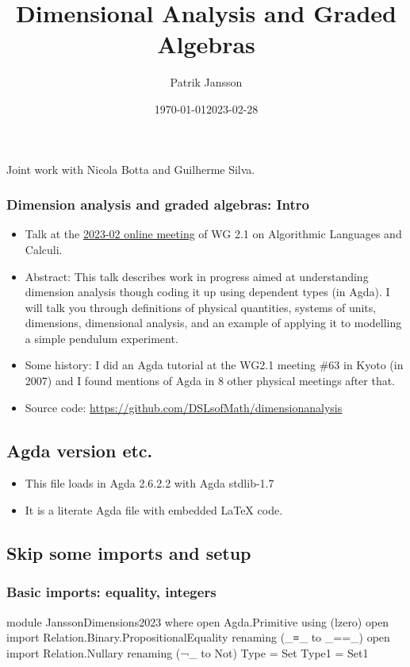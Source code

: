\documentclass[aspectratio=169]{beamer}
\author[Jansson]{Patrik Jansson}
\date{\today}
\institute[FP unit, Chalmers]{Functional Programming unit, Chalmers University of Technology}
\date{2023-02-28}
\title{Dimensional Analysis and Graded Algebras}
\begin{document}
\begin{frame}
  \maketitle
  Joint work with Nicola Botta and Guilherme Silva.
\end{frame}
\begin{frame}
\frametitle{Dimension analysis and graded algebras: Intro}
\begin{itemize}
\item Talk at the \href{https://ifipwg21wiki.cs.kuleuven.be/IFIP21/OnlineFeb23}{2023-02 online meeting} of WG 2.1 on Algorithmic Languages and Calculi.
\item Abstract:
This talk describes work in progress aimed at understanding dimension analysis
though coding it up using dependent types (in Agda). I will talk you through
definitions of physical quantities, systems of units, dimensions, dimensional
analysis, and an example of applying it to modelling a simple pendulum
experiment.
\item Some history: I did an Agda tutorial at the WG2.1 meeting \#63 in Kyoto
(in 2007) and I found mentions of Agda in 8 other physical meetings after
that.
\item Source code: \url{https://github.com/DSLsofMath/dimensionanalysis}
\end{itemize}
\subsection{Agda version etc.}
\begin{itemize}
\item This file loads in Agda 2.6.2.2 with Agda stdlib-1.7
\item It is a literate Agda file with embedded LaTeX code.
\end{itemize}
\subsection{Skip some imports and setup}
\subsubsection{Basic imports: equality, integers}
\begin{code}
module JanssonDimensions2023 where
open Agda.Primitive using (lzero)
open import Relation.Binary.PropositionalEquality renaming (_≡_ to _==_)
open import Relation.Nullary renaming (¬_ to Not)
Type = Set
Type1 = Set1


\end{code}
\end{frame}
\end{document}
